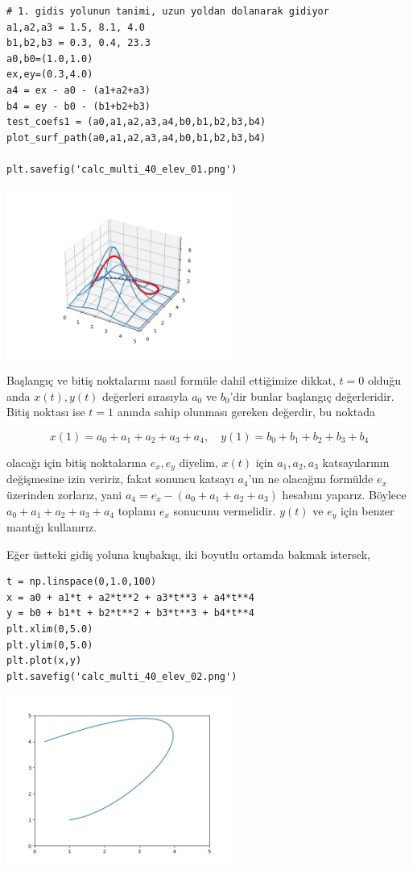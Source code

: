 \documentclass[12pt,fleqn]{article}\usepackage{../../common}
\begin{document}
\begin{verbatim}
# 1. gidis yolunun tanimi, uzun yoldan dolanarak gidiyor
a1,a2,a3 = 1.5, 8.1, 4.0
b1,b2,b3 = 0.3, 0.4, 23.3
a0,b0=(1.0,1.0)
ex,ey=(0.3,4.0)
a4 = ex - a0 - (a1+a2+a3)
b4 = ey - b0 - (b1+b2+b3)
test_coefs1 = (a0,a1,a2,a3,a4,b0,b1,b2,b3,b4)
plot_surf_path(a0,a1,a2,a3,a4,b0,b1,b2,b3,b4)

plt.savefig('calc_multi_40_elev_01.png')
\end{verbatim}

\includegraphics[width=20em]{calc_multi_40_elev_01.png}

Başlangıç ve bitiş noktalarını nasıl formüle dahil ettiğimize dikkat, $t=0$
olduğu anda $x(t),y(t)$ değerleri sırasıyla $a_0$ ve $b_0$'dir bunlar başlangıç
değerleridir. Bitiş noktası ise $t=1$ anında sahip olunması gereken değerdir,
bu noktada

$$
x(1) = a_0 + a_1 + a_2 + a_3 + a_4 ,\quad
y(1) = b_0 + b_1 + b_2 + b_3 + b_4 
$$

olacağı için bitiş noktalarına $e_x,e_y$ diyelim, $x(t)$ için $a_1,a_2,a_3$
katsayılarının değişmesine izin veririz, fakat sonuncu katsayı $a_4$'un ne
olacağını formülde $e_x$ üzerinden zorlarız, yani $a_4 = e_x - (a_0 + a_1 + a_2
+ a_3)$ hesabını yaparız. Böylece $a_0 + a_1 + a_2 + a_3 + a_4$ toplamı
$e_x$ sonucunu vermelidir. $y(t)$ ve $e_y$ için benzer mantığı kullanırız.

Eğer üstteki gidiş yoluna kuşbakışı, iki boyutlu ortamda bakmak istersek,

\begin{verbatim}
t = np.linspace(0,1.0,100)
x = a0 + a1*t + a2*t**2 + a3*t**3 + a4*t**4 
y = b0 + b1*t + b2*t**2 + b3*t**3 + b4*t**4
plt.xlim(0,5.0)
plt.ylim(0,5.0)
plt.plot(x,y)
plt.savefig('calc_multi_40_elev_02.png')
\end{verbatim}

\includegraphics[width=20em]{calc_multi_40_elev_02.png}
\end{document}
